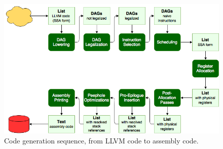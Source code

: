 \begin{figure}[b!]
\centering
\includegraphics[width=\textwidth]{figures/code_generation_sequence}
\caption{Code generation sequence, from LLVM code to assembly code.}
\label{fig:code_generation}
\end{figure}

